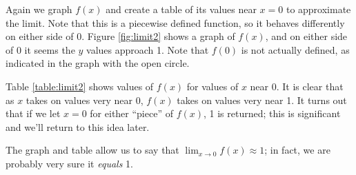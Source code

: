 \begin{solution}
{Again we graph $f(x)$ and create a table of its values near $x=0$ to approximate the limit. Note that this is a piecewise defined function, so it behaves differently on either side of 0. Figure \ref{fig:limit2} shows a graph of $f(x)$, and on either side of 0 it seems the $y$ values approach 1. Note that $f(0)$ is not actually defined, as indicated in the graph with the open circle.


Table \ref{table:limit2} shows values of $f(x)$ for values of $x$ near 0. It is clear that as $x$ takes on values very near 0, $f(x)$ takes on values very near 1. It turns out that if we let $x=0$ for either ``piece'' of $f(x)$, 1 is returned; this is significant and we'll return to this idea later.

The graph and table allow us to say that $\lim_{x\to 0}f(x) \approx 1$; in fact, we are probably very sure it \textit{equals} 1.
}
\end{solution}




